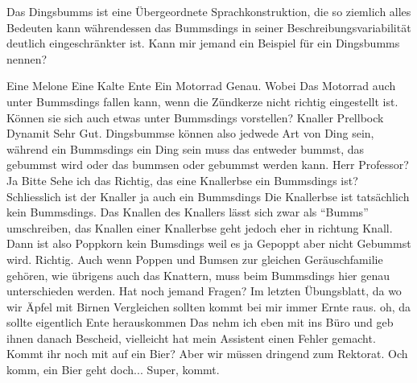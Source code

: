 \begin{verseplay}[3em]
\s\Prof {} Das Dingsbumms ist eine Übergeordnete Sprachkonstruktion, die so ziemlich alles Bedeuten kann währendessen das Bummsdings  in seiner Beschreibungsvariabilität deutlich eingeschränkter ist. Kann mir jemand ein Beispiel für ein Dingsbumms nennen?

\s\Studc Eine Melone 
\s\Studa Eine Kalte Ente 
\s\Studb Ein Motorrad 
\s\Prof Genau. Wobei Das Motorrad auch unter Bummsdings fallen kann, wenn die Zündkerze nicht richtig eingestellt ist. Können sie sich auch etwas unter Bummsdings vorstellen?
\s\Studa Knaller 
\s\Studb Prellbock 
\s\Gimli Dynamit 
\s\Prof Sehr Gut. Dingsbummse können also jedwede Art von Ding sein, während ein Bummsdings ein Ding sein muss das entweder bummst, das gebummst wird oder das bummsen oder gebummst werden kann. 
\s\Studb Herr Professor?
\s\Prof Ja Bitte
\s\Studb Sehe ich das Richtig, das eine Knallerbse ein Bummsdings ist? Schliesslich ist der Knaller ja auch ein Bummsdings
\s\Prof {} Die Knallerbse ist tatsächlich kein Bummsdings. Das Knallen des Knallers lässt sich zwar als ``Bumms'' umschreiben, das Knallen einer Knallerbse geht jedoch eher in richtung Knall.
\s\Studb Dann ist also Poppkorn kein Bumsdings weil es ja Gepoppt aber nicht Gebummst wird.
\s\Prof Richtig. Auch wenn Poppen und Bumsen zur gleichen Geräuschfamilie gehören, wie übrigens auch das Knattern, muss beim Bummsdings hier genau unterschieden werden. Hat noch jemand Fragen?
\s\Studa Im letzten Übungsblatt, da wo wir Äpfel mit Birnen Vergleichen sollten kommt bei mir immer Ernte raus.
\s\Prof oh, da sollte eigentlich Ente herauskommen  Das nehm ich eben mit ins Büro und geb ihnen danach Bescheid, vielleicht hat mein Assistent einen Fehler gemacht.
\s\Studa {} Kommt ihr noch mit auf ein Bier?
\s\Gimli Aber wir müssen dringend zum  Rektorat.
\s\Sum Och komm, ein Bier geht doch...
\s\Studb Super, kommt.

\end{verseplay}


